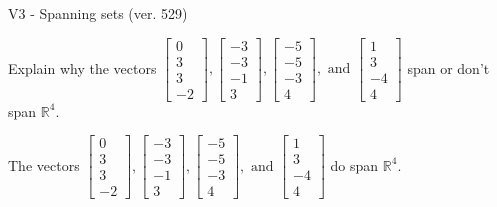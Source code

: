 \begin{exercise}
  \begin{exerciseTitle}V3 - Spanning sets (ver. 529)\end{exerciseTitle}
  \begin{exerciseStatement}
    Explain why the vectors \(\left[\begin{array}{r}
0 \\
3 \\
3 \\
-2
\end{array}\right] , \left[\begin{array}{r}
-3 \\
-3 \\
-1 \\
3
\end{array}\right] , \left[\begin{array}{r}
-5 \\
-5 \\
-3 \\
4
\end{array}\right] , \text{ and } \left[\begin{array}{r}
1 \\
3 \\
-4 \\
4
\end{array}\right]\) span or don't span \(\mathbb{R}^4\). 
	


  \end{exerciseStatement}
  \begin{exerciseAnswer}
   The vectors \(\left[\begin{array}{r}
0 \\
3 \\
3 \\
-2
\end{array}\right] , \left[\begin{array}{r}
-3 \\
-3 \\
-1 \\
3
\end{array}\right] , \left[\begin{array}{r}
-5 \\
-5 \\
-3 \\
4
\end{array}\right] , \text{ and } \left[\begin{array}{r}
1 \\
3 \\
-4 \\
4
\end{array}\right]\) 
  	 do  
	span \(\mathbb{R}^4\).
  


  \end{exerciseAnswer}
\end{exercise}